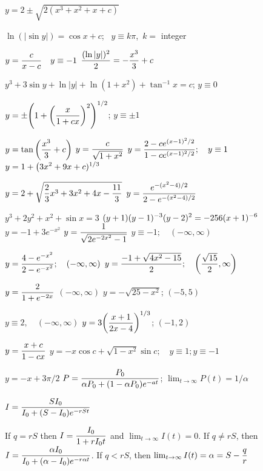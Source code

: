 \medskip

\rm
{} $y=2\pm\sqrt{2(x^{3}+x^{2}+x+c)}$

 $\ln(|\sin y|)=\cos x+c$;   \, $y\equiv k\pi$,\, $k=$
{\rm integer}

 $\displaystyle{y=\frac{c}{x-c}\quad y\equiv-1}$      \quad
{}
$\displaystyle\frac{(\ln |y|)^{2}}{2}=-\frac{x^{3}}{3}+c$

$y^{3}+3\sin y+\ln|y|+\ln(1+x^{2})+\tan^{-1}x=c$;   $y\equiv0$

$y=\pm\displaystyle{\left(1+\left(\frac{x}{1+cx}\right)^{2}\right)^{1/2}}$;
$y\equiv\pm1$

 $\displaystyle{y=\tan\left(\frac{x^{3}}{3}+c\right)}$
 $y=\displaystyle\frac{c}{\sqrt{1+x^{2}}}$
$\displaystyle{y=\frac{2-ce^{(x-1)^{2}/2}}{1-ce^{(x-1)^{2}/2}};\quad y\equiv
1}$
$\displaystyle{y=1+\big(3x^{2}+9x+c)^{1/3}}$

$\displaystyle{y=2+\sqrt{\frac{2}{3}x^{3}+3x^{2}+4x-\frac{11}{3}}}$
 $\displaystyle{y=\frac{e^{-(x^{2}-4)/2}}{2-e^{-(x^{2}-4)/2}}}$

$y^{3}+2y^{2}+x^{2}+\sin x=3$
 $\displaystyle{(y+1)(y-1)^{-3}(y-2)^{2}=-256(x+1)^{-6}}$
  $y=-1+3e^{-x^{2}}$
$y=\displaystyle\frac{1}{\sqrt{2e^{-2x^{2}}-1}}$
 $y\equiv-1;\quad(-
\infty,\infty)$
\quad

$\displaystyle{y=\frac{4-e^{-x^{2}}}{2-e^{-x^{2}}};\quad(-\infty,\infty)}$
 $\displaystyle{y=\frac{-1+\sqrt{4x^{2}-15}}{2};\quad\left(\frac{\sqrt{15}}{2},\infty\right)}$

 $y=\displaystyle{\frac{2}{1+e^{-2x}}}$   \quad $(-\infty,\infty)$
 $y=-\sqrt{25-x^{2}}$;   \quad $(-5,5)$

 $y\equiv2,\quad(-\infty,\infty)$
 $y=3\displaystyle{\left(\frac{x+1}{2x-4}\right)^{1/3}}$;
\quad $(-1,2)$

$y=\displaystyle\frac{x+c}{1-cx}$
$y=-x\cos c+\sqrt{1-x^{2}}\sin c;
 \quad y\equiv1;y\equiv-1$

 $y=-x+3\pi/2$
  $P=\displaystyle\frac{P_{0}}{\alpha
P_{0}+(1-\alpha P_{0})e^{-at}}$;   $\lim_{t\to\infty}P(t)=1/\alpha$

$I=\displaystyle\frac{SI_{0}}{I_{0}+(S-I_{0})e^{-rSt}}$

If $q=rS$ then $I=\displaystyle\frac{I_{0}}{1+rI_{0}t}$ and
$\lim_{t\to\infty}I(t)=0$. If $q\ne rS$, then
\quad \quad  $I=\displaystyle\frac{\alpha I_{0}}{I_{0}+(\alpha-I_{0})e^{-r\alpha t}}$. If $q<rS$, then
$\lim_{t\to\infty}I(t)=\alpha=S-\displaystyle\frac{q}{r}$

